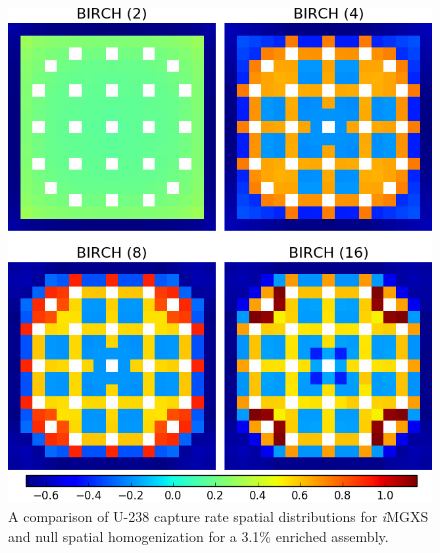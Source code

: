 \begin{figure}[h!]
\centering
\includegraphics[width=0.9\linewidth]{figures/results/compare/assm-31/compare-capt}
\vspace{2mm}
\caption[U-238 capture rate comparison for a 3.1\% enriched assembly]{A comparison of U-238 capture rate spatial distributions for \textit{i}\ac{MGXS} and null spatial homogenization for a 3.1\% enriched assembly.}
\label{fig:chap11-assm-3.1-capt-rates-comp}
\end{figure}

\clearpage


